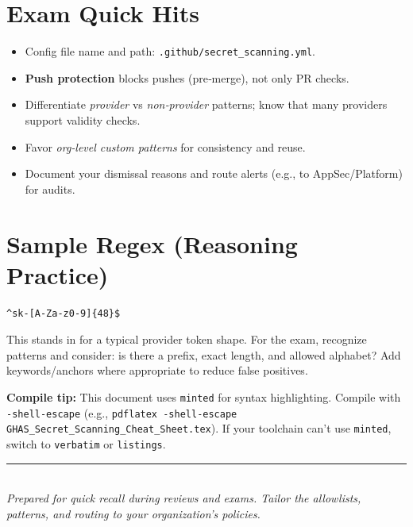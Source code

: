 \documentclass[11pt,a4paper]{article}
\begin{document}
\section{Exam Quick Hits}
\begin{itemize}
  \item Config file name and path: \texttt{.github/secret\_scanning.yml}.
  \item \textbf{Push protection} blocks pushes (pre‑merge), not only PR checks.
  \item Differentiate \textit{provider} vs \textit{non‑provider} patterns; know that many providers support validity checks.
  \item Favor \textit{org‑level custom patterns} for consistency and reuse.
  \item Document your dismissal reasons and route alerts (e.g., to AppSec/Platform) for audits.
\end{itemize}

\section{Sample Regex (Reasoning Practice)}
\begin{verbatim}
^sk-[A-Za-z0-9]{48}$
\end{verbatim}
This stands in for a typical provider token shape. For the exam, recognize patterns and consider: is there a prefix, exact length, and allowed alphabet? Add keywords/anchors where appropriate to reduce false positives.

\begin{examtip}
\raggedright\textbf{Compile tip:} This document uses \texttt{minted} for syntax highlighting. Compile with \texttt{-shell-escape} (e.g., \texttt{pdflatex -shell-escape}\allowbreak{} \nolinkurl{GHAS_Secret_Scanning_Cheat_Sheet.tex}). If your toolchain can't use \texttt{minted}, switch to \texttt{verbatim} or \texttt{listings}.
\end{examtip}

\vspace{4pt}
\noindent\rule{\linewidth}{0.4pt}\\[-2pt]
{\footnotesize\textit{Prepared for quick recall during reviews and exams. Tailor the allowlists, patterns, and routing to your organization’s policies.}}
\end{document}

